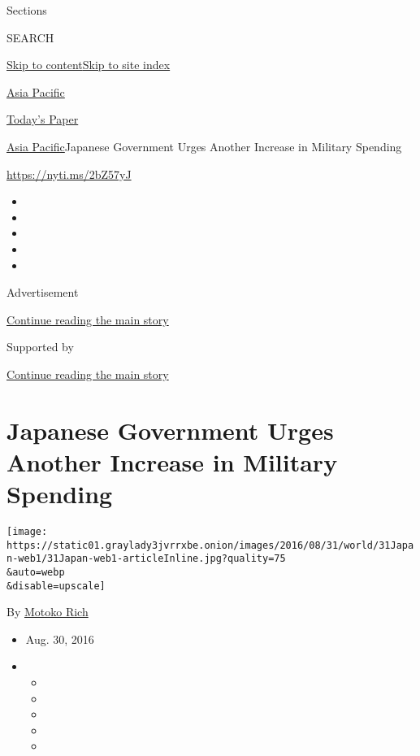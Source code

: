 Sections

SEARCH

\protect\hyperlink{site-content}{Skip to
content}\protect\hyperlink{site-index}{Skip to site index}

\href{https://www.nytimes3xbfgragh.onion/section/world/asia}{Asia
Pacific}

\href{https://myaccount.nytimes3xbfgragh.onion/auth/login?response_type=cookie\&client_id=vi}{}

\href{https://www.nytimes3xbfgragh.onion/section/todayspaper}{Today's
Paper}

\href{/section/world/asia}{Asia Pacific}\textbar{}Japanese Government
Urges Another Increase in Military Spending

\url{https://nyti.ms/2bZ57yJ}

\begin{itemize}
\item
\item
\item
\item
\item
\end{itemize}

Advertisement

\protect\hyperlink{after-top}{Continue reading the main story}

Supported by

\protect\hyperlink{after-sponsor}{Continue reading the main story}

\hypertarget{japanese-government-urges-another-increase-in-military-spending}{%
\section{Japanese Government Urges Another Increase in Military
Spending}\label{japanese-government-urges-another-increase-in-military-spending}}

\texttt{[image: https://static01.graylady3jvrrxbe.onion/images/2016/08/31/world/31Japan-web1/31Japan-web1-articleInline.jpg?quality=75\\\&auto=webp\\\&disable=upscale]}

By \href{http://www.nytimes3xbfgragh.onion/by/motoko-rich}{Motoko Rich}

\begin{itemize}
\item
  Aug. 30, 2016
\item
  \begin{itemize}
  \item
  \item
  \item
  \item
  \item
  \end{itemize}
\end{itemize}

